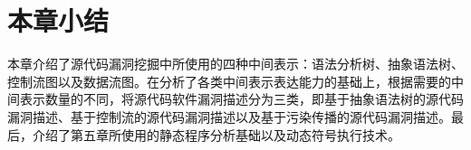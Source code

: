 %
%
%
%




\section{本章小结}

本章介绍了源代码漏洞挖掘中所使用的四种中间表示：语法分析树、抽象语法树、控制流图以及数据流图。在分析了各类中间表示表达能力的基础上，根据需要的中间表示数量的不同，将源代码软件漏洞描述分为三类，即基于抽象语法树的源代码漏洞描述、基于控制流的源代码漏洞描述以及基于污染传播的源代码漏洞描述。最后，介绍了第五章所使用的静态程序分析基础以及动态符号执行技术。
